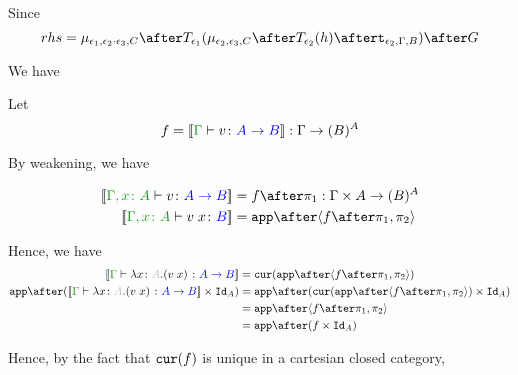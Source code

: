 \documentclass{report}
\begin{document}
Since 
\begin{equation}
rhs = \bind{\e_1}{\e_2\dot\e_3}{C}\after\T{\e_1}{(\bind{\e_2}{\e_3}{C}\after \T{\e_2}{(h)} \after \tstrength{\e_2}{\G}{B})}\after G
\end{equation}

We have



Let 
\begin{equation}
    f = \deno{\gtyperelation{v}{\ab}} : \G \rightarrow (B)^{A}
\end{equation}

By weakening, we have

\begin{align*}
    \deno{\typerelation{\gax}{v}{\ab}} & = f \after \p : \G \times A \rightarrow (B)^A \\
    \deno{\typerelation{\gax}{\apply{v}{x}}{B}} & = \app\after\pr{f \after \p}{\pp}
\end{align*}

Hence, we have 
\begin{align}
        \deno{\gtyperelation{\lam{x}{A}{(\apply{v}{x})}}{\ab}} & = \cur{\app\after\pr{f \after \p}{\pp}}\\
        \app\after(\deno{\gtyperelation{\lam{x}{A}{(\apply{v}{x})}}{\ab}} \times \Id{A}) & = \app \after(\cur{\app\after\pr{f \after \p}{\pp}}\times \Id{A})\\
        & = \app \after\pr{f\after\p}{\pp}\\
        & = \app\after(f\times\Id{A})
\end{align}

Hence, by the fact that $\texttt{cur}(f)$ is unique in a cartesian closed category, 
\end{document}
